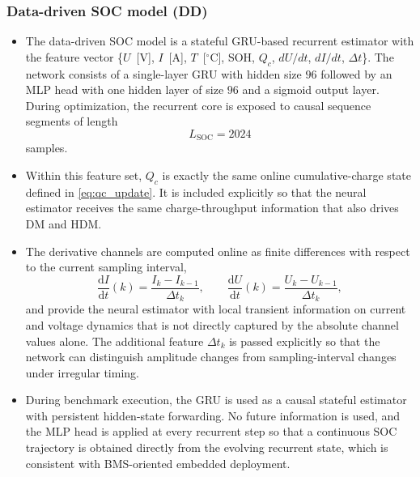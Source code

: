 \documentclass[review,nopreprintline]{elsarticle}
\begin{document}
\subsubsection{Data-driven SOC model (DD)}
\begin{itemize}[leftmargin=*]
    \item The data-driven SOC model is a stateful GRU-based recurrent estimator with the feature vector \{$U$~[V], $I$~[A], $T$~[$^\circ$C], SOH, $Q_c$, $dU/dt$, $dI/dt$, $\Delta t$\}. The network consists of a single-layer GRU with hidden size $96$ followed by an MLP head with one hidden layer of size $96$ and a sigmoid output layer. During optimization, the recurrent core is exposed to causal sequence segments of length
    \begin{equation}
        L_{\mathrm{SOC}} = 2024
    \end{equation}
    samples.
    \item Within this feature set, $Q_c$ is exactly the same online cumulative-charge state defined in \eqref{eq:qc_update}. It is included explicitly so that the neural estimator receives the same charge-throughput information that also drives DM and HDM.
    \item The derivative channels are computed online as finite differences with respect to the current sampling interval,
    \begin{equation}
        \frac{\mathrm{d}I}{\mathrm{d}t}(k)=\frac{I_k-I_{k-1}}{\Delta t_k},
        \qquad
        \frac{\mathrm{d}U}{\mathrm{d}t}(k)=\frac{U_k-U_{k-1}}{\Delta t_k},
        \label{eq:derivative_features}
    \end{equation}
    and provide the neural estimator with local transient information on current and voltage dynamics that is not directly captured by the absolute channel values alone. The additional feature $\Delta t_k$ is passed explicitly so that the network can distinguish amplitude changes from sampling-interval changes under irregular timing.
    \item During benchmark execution, the GRU is used as a causal stateful estimator with persistent hidden-state forwarding. No future information is used, and the MLP head is applied at every recurrent step so that a continuous SOC trajectory is obtained directly from the evolving recurrent state, which is consistent with BMS-oriented embedded deployment.
\end{itemize}
\end{document}
